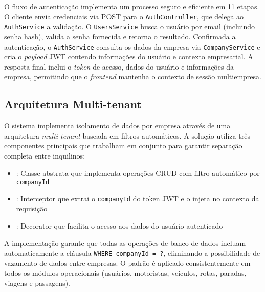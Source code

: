 O fluxo de autenticação implementa um processo seguro e eficiente em 11 etapas. O cliente envia credenciais via POST para o \texttt{AuthController}, que delega ao \texttt{AuthService} a validação. O \texttt{UsersService} busca o usuário por email (incluindo senha hash), valida a senha fornecida e retorna o resultado. Confirmada a autenticação, o \texttt{AuthService} consulta os dados da empresa via \texttt{CompanyService} e cria o \textit{payload} JWT contendo informações do usuário e contexto empresarial. A resposta final inclui o \textit{token} de acesso, dados do usuário e informações da empresa, permitindo que o \textit{frontend} mantenha o contexto de sessão multiempresa.

\subsection{Arquitetura Multi-tenant}

O sistema implementa isolamento de dados por empresa através de uma arquitetura \textit{multi-tenant} baseada em filtros automáticos. A solução utiliza três componentes principais que trabalham em conjunto para garantir separação completa entre inquilinos:

\begin{itemize}
  \item {}: Classe abstrata que implementa operações CRUD com filtro automático por \texttt{companyId}
  \item {}: Interceptor que extrai o \texttt{companyId} do token JWT e o injeta no contexto da requisição
  \item {}: Decorator que facilita o acesso aos dados do usuário autenticado
\end{itemize}

A implementação garante que todas as operações de banco de dados incluam automaticamente a cláusula \texttt{WHERE companyId = ?}, eliminando a possibilidade de vazamento de dados entre empresas. O padrão é aplicado consistentemente em todos os módulos operacionais (usuários, motoristas, veículos, rotas, paradas, viagens e passagens).

